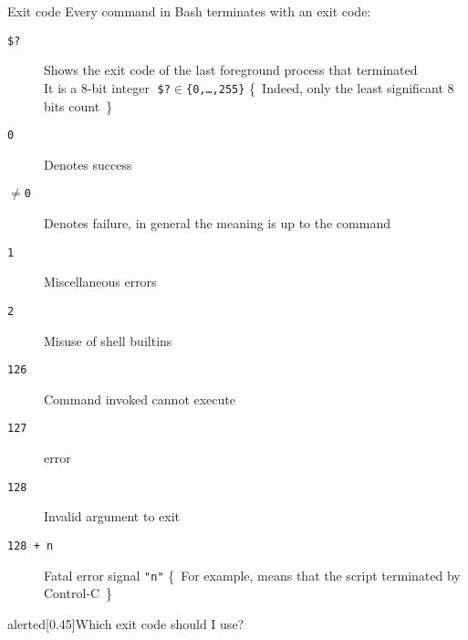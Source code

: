 
\begin{frame}{Exit code}
    \vspace{-3mm}
    Every command in Bash terminates with an exit code:
    \begin{description}
        \item[\texttt{\$?}]
            Shows the exit code of the last foreground process that terminated\\
            It is a 8-bit integer $\;$\texttt{\$?}${}\in{}$\texttt{\{0,\dots,255\}} \hfill{\tiny\{~Indeed, only the least significant 8 bits count~\}}
        \item[\texttt{0}] Denotes success
        \item[$\neq$\texttt{0}] Denotes failure, in general the meaning is up to the command
        \item[\texttt{1}] Miscellaneous errors
        \item[\texttt{2}] Misuse of shell builtins
        \item[\texttt{126}] Command invoked cannot execute
        \item[\texttt{127}]  error
        \item[\texttt{128}] Invalid argument to exit
        \item[\texttt{128 + n}] Fatal error signal \texttt{"n"} {\tiny\{~For example,  means that the script terminated by Control-C~\}}
    \end{description}
    \begin{varblock}{alerted}[0.45\textwidth]{Which exit code should I use?}
    \end{varblock}
\end{frame}
